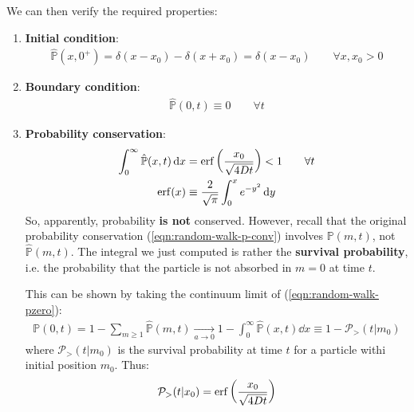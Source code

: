 \documentclass[../../main.tex]{subfiles}
\begin{document}
We can then verify the required properties:
\begin{enumerate}
    \item \textbf{Initial condition}:
    \begin{align*}
        \hat{\mathbb{P}}(x,0^+) = \delta(x-x_0) - \delta(x+x_0) = \delta(x-x_0) \qquad \forall x,x_0 > 0
    \end{align*} 
    \item \textbf{Boundary condition}:
    \begin{align*}
        \hat{\mathbb{P}}(0,t) \equiv 0 \qquad \forall t
    \end{align*} 
    \item \textbf{Probability conservation}:
    \begin{align*}
        \int_0^\infty \hat{\mathbb{P}}(x,t) \dd{x} &= \erf \left(\frac{x_0}{\sqrt{4 D t}} \right) < 1 \qquad \forall t\\
        \erf(x) &\equiv \frac{2}{\sqrt{\pi}} \int_0^x e^{-y^2}\dd{y}
    \end{align*} 
    So, apparently, probability \textbf{is not} conserved. However, recall that the original probability conservation (\ref{eqn:random-walk-p-conv}) involves $\mathbb{P}(m,t)$, not $\hat{\mathbb{P}}(m,t)$. The integral we just computed is rather the \textbf{survival probability}, i.e. the probability that the particle is not absorbed in $m=0$ at time $t$.
    
    This can be shown by taking the continuum limit of (\ref{eqn:random-walk-pzero}):
    \begin{align*}
        \mathbb{P}(0,t) = 1 - \sum_{m \geq 1} \hat{\mathbb{P}}(m,t)  \xrightarrow[a \to 0]{}  1 - \int_0^\infty \hat{\mathbb{P}}(x,t)\dd{x} \equiv 1 - \mathcal{P}_>(t|m_0)
    \end{align*} 
    where $\mathcal{P}_>(t|m_0)$ is the survival probability at time $t$ for a particle withi initial position $m_0$. Thus:
    \begin{align}\label{eqn:random-walk-psurv}
        \mathcal{P}_>(t|x_0) = \erf\left(\frac{x_0}{\sqrt{4 D t}} \right)
    \end{align}


\end{enumerate}
\end{document}
